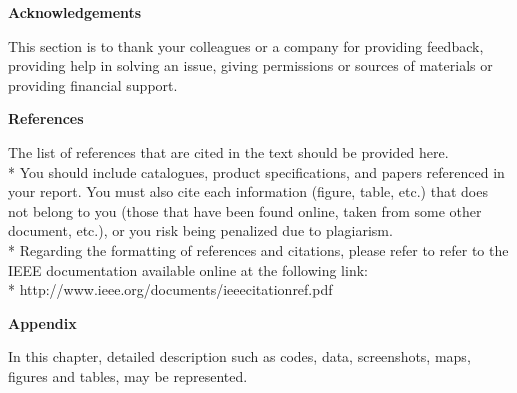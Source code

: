 \documentclass{article}
\begin{document}
\begin{center}
    \textbf{\Large Acknowledgements}
\end{center}
This section is to thank your colleagues or a company for providing feedback, providing help in solving an issue, giving permissions or sources of materials or providing financial support.

\begin{center}
    \textbf{\Large References}
\end{center}
The list of references that are cited in the text should be provided here. \vspace{0.1cm}\\*
You should include catalogues, product specifications, and papers referenced in your report. You must also cite each information (figure, table, etc.) that does not belong to you (those that have been found online, taken from some other document, etc.), or you risk being penalized due to plagiarism. \vspace{0.1cm}\\*
Regarding the formatting of references and citations, please refer to refer to the IEEE documentation available online at the following link:\\* http://www.ieee.org/documents/ieeecitationref.pdf

\begin{center}
    \textbf{\Large Appendix}
\end{center}
In this chapter, detailed description such as codes, data, screenshots, maps, figures and tables, may be represented.
\end{document}

